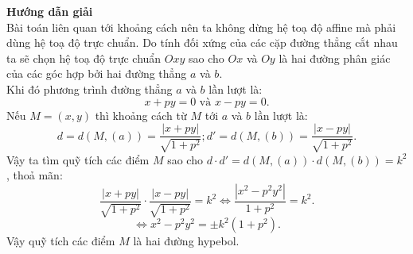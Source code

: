 \documentclass[12pt,a4]{article}
\begin{document}
\begin{titlepage}
\begin{center}
\end{center}
\textbf{Hướng dẫn giải}\\
Bài toán liên quan tới khoảng cách nên ta không dừng hệ toạ độ affine mà phải dùng hệ toạ độ trực chuẩn. Do tính đối xứng của các cặp đường thẳng cắt nhau ta sẽ chọn hệ toạ độ trực chuẩn $Oxy$ sao cho $Ox$ và $Oy$ là hai đường phân giác của các góc hợp bởi hai đường thẳng $a$ và $b$.\\
Khi đó phương trình đường thẳng $a$ và $b$ lần lượt là:
\[
x + py = 0 \text{ và } x - py = 0.
\]
Nếu $M = (x,y)$ thì khoảng cách từ $M$ tới $a$ và $b$ lần lượt là:
\[
d = d(M,(a)) = \frac{|x + py|}{\sqrt{1 + p^2}}; d' = d(M,(b)) = \frac{|x - py|}{\sqrt{1 + p^2}}.
\]
Vậy ta tìm quỹ tích các điểm $M$ sao cho $d\cdot d' = d(M,(a)) \cdot d(M,(b)) = k^2$, thoả mãn:
\[
\frac{|x + py|}{\sqrt{1 + p^2}} \cdot \frac{|x - py|}{\sqrt{1 + p^2}} = k^2 \Leftrightarrow \frac{|x^2 - p^2y^2|}{1 + p^2} = k^2.
\]
\[
\Leftrightarrow x^2 - p^2y^2 = \pm k^2(1 + p^2).
\]
Vậy quỹ tích các điểm $M$ là hai đường hypebol.
\vspace{0.2cm}

\end{titlepage}
\end{document}
